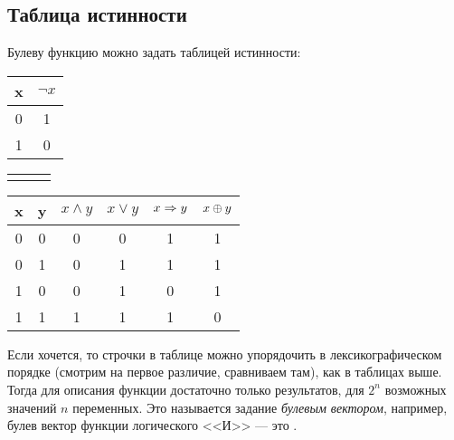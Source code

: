 \documentclass[a4paper]{report}
\begin{document}
    \subsection{Таблица истинности}
    Булеву функцию можно задать таблицей истинности:
    \begin{table}[!ht]
        \centering
        \begin{tabular}{c | c}
            x & $\neg x$ \\
            \hline
            0 & 1        \\
            1 & 0        \\
        \end{tabular}
        \begin{tabular}{c c c}
            & &
        \end{tabular}
        \begin{tabular}{c c | c c c c}
            x & y & $x \land y$ & $x \lor y$ & $x \Rightarrow y$ & $x \oplus y$ \\
            \hline
            0 & 0 & 0           & 0          & 1           & 1          \\
            0 & 1 & 0           & 1          & 1           & 1          \\
            1 & 0 & 0           & 1          & 0           & 1          \\
            1 & 1 & 1           & 1          & 1           & 0          \\
        \end{tabular}
    \end{table}
    Если хочется, то строчки в таблице можно упорядочить в лексикографическом порядке (смотрим на первое различие, сравниваем там), как в таблицах выше.
    Тогда для описания функции достаточно только результатов, для $2^n$ возможных значений $n$ переменных.
    Это называется задание \emph{булевым вектором}, например, булев вектор функции логического <<И>> --- это .

\end{document}
